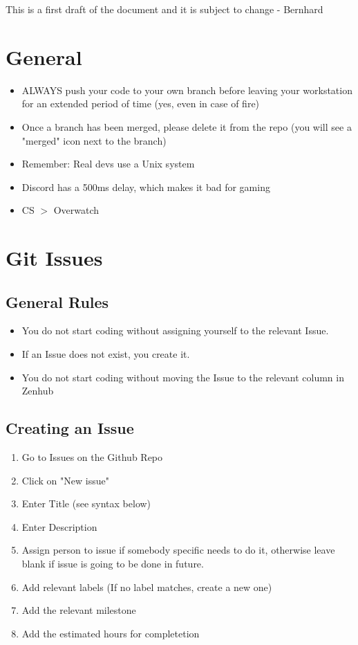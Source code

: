 \documentclass{article}
\begin{document}
\newpage
\tableofcontents
\newpage

	This is a first draft of the document and it is subject to change - Bernhard
	\section{General}
		\begin{itemize}
			\item ALWAYS push your code to your own branch before leaving your workstation for an extended period of time (yes, even in case of fire)
			\item Once a branch has been merged, please delete it from the repo (you will see a "merged" icon next to the branch)
			\item Remember: Real devs use a Unix system
			\item Discord has a 500ms delay, which makes it bad for gaming
			\item CS $>$ Overwatch
		\end{itemize}

	\section{Git Issues}
		\subsection{General Rules}
			\begin{itemize}
				\item You do not start coding without assigning yourself to the relevant Issue.
				\item If an Issue does not exist, you create it.
				\item You do not start coding without moving the Issue to the relevant column in Zenhub
			\end{itemize}

		\subsection{Creating an Issue}
			\begin{enumerate}
				\item Go to Issues on the Github Repo
				\item Click on "New issue"
				\item Enter Title (see syntax below)
				\item Enter Description
				\item Assign person to issue if somebody specific needs to do it, otherwise leave blank if issue is going to be done in future.
				\item Add relevant labels (If no label matches, create a new one)
				\item Add the relevant milestone
				\item Add the estimated hours for completetion
			\end{enumerate}
\end{document}
